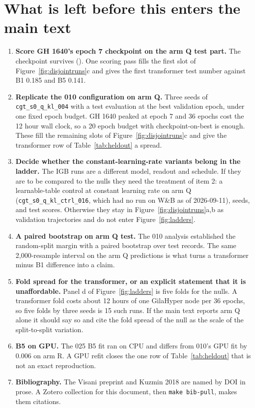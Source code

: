 
\section{What is left before this enters the main text}
\label{sec:remaining}

\begin{enumerate}
\item \textbf{Score GH 1640's epoch 7 checkpoint on the arm Q test part.} The
  checkpoint survives
  (). One
  scoring pass fills the first slot of Figure~\ref{fig:disjointruns}c and gives the
  first transformer test number against B1 0.185 and B5 0.141.
\item \textbf{Replicate the 010 configuration on arm Q.} Three seeds of
  \texttt{cgt\_s0\_q\_kl\_004} with a test evaluation at the best validation epoch,
  under one fixed epoch budget. GH 1640 peaked at epoch 7 and 36 epochs cost the 12
  hour wall clock, so a 20 epoch budget with checkpoint-on-best is enough. These
  fill the remaining slots of Figure~\ref{fig:disjointruns}c and give the
  transformer row of Table~\ref{tab:heldout} a spread.
\item \textbf{Decide whether the constant-learning-rate variants belong in the
  ladder.} The IGB runs are a different model, readout and schedule. If they are to
  be compared to the nulls they need the treatment of item 2: a learnable-table
  control at constant learning rate on arm Q
  (\texttt{cgt\_s0\_q\_kl\_ctrl\_016}, which had no run on W\&B as of
  2026-09-11), seeds, and test scores. Otherwise they stay in
  Figure~\ref{fig:disjointruns}a,b as validation trajectories and do not enter
  Figure~\ref{fig:ladders}.
\item \textbf{A paired bootstrap on arm Q test.} The 010 analysis established the
  random-split margin with a paired bootstrap over test records. The same
  2{,}000-resample interval on the arm Q predictions is what turns a transformer
  minus B1 difference into a claim.
\item \textbf{Fold spread for the transformer, or an explicit statement that it is
  unaffordable.} Panel d of Figure~\ref{fig:ladders} is five folds for the nulls. A
  transformer fold costs about 12 hours of one GilaHyper node per 36 epochs, so five
  folds by three seeds is 15 such runs. If the main text reports arm Q alone it
  should say so and cite the fold spread of the null as the scale of the
  split-to-split variation.
\item \textbf{B5 on GPU.} The 025 B5 fit ran on CPU and differs from 010's GPU fit
  by 0.006 on arm R. A GPU refit closes the one row of Table~\ref{tab:heldout} that
  is not an exact reproduction.
\item \textbf{Bibliography.} The Visani preprint and Kuzmin 2018 are named by DOI in
  prose. A Zotero collection for this document, then \texttt{make bib-pull}, makes
  them citations.
\end{enumerate}

